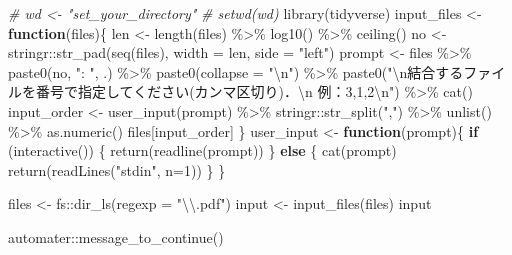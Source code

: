 \documentclass[
]{article}
\newenvironment{Shaded}{\begin{snugshade}}{\end{snugshade}}
\newcommand{\AttributeTok}[1]{\textcolor[rgb]{0.77,0.63,0.00}{#1}}
\newcommand{\CommentTok}[1]{\textcolor[rgb]{0.56,0.35,0.01}{\textit{#1}}}
\newcommand{\ControlFlowTok}[1]{\textcolor[rgb]{0.13,0.29,0.53}{\textbf{#1}}}
\newcommand{\DecValTok}[1]{\textcolor[rgb]{0.00,0.00,0.81}{#1}}
\newcommand{\FunctionTok}[1]{\textcolor[rgb]{0.00,0.00,0.00}{#1}}
\newcommand{\NormalTok}[1]{#1}
\newcommand{\OtherTok}[1]{\textcolor[rgb]{0.56,0.35,0.01}{#1}}
\newcommand{\SpecialCharTok}[1]{\textcolor[rgb]{0.00,0.00,0.00}{#1}}
\newcommand{\StringTok}[1]{\textcolor[rgb]{0.31,0.60,0.02}{#1}}
\begin{document}
\begin{Shaded}
\begin{Highlighting}[]
  \CommentTok{\# wd \textless{}{-} "set\_your\_directory"}
  \CommentTok{\# setwd(wd)}
\FunctionTok{library}\NormalTok{(tidyverse)}
\NormalTok{input\_files }\OtherTok{\textless{}{-}} \ControlFlowTok{function}\NormalTok{(files)\{}
\NormalTok{  len }\OtherTok{\textless{}{-}} \FunctionTok{length}\NormalTok{(files) }\SpecialCharTok{\%\textgreater{}\%} \FunctionTok{log10}\NormalTok{() }\SpecialCharTok{\%\textgreater{}\%} \FunctionTok{ceiling}\NormalTok{()}
\NormalTok{  no }\OtherTok{\textless{}{-}}\NormalTok{ stringr}\SpecialCharTok{::}\FunctionTok{str\_pad}\NormalTok{(}\FunctionTok{seq}\NormalTok{(files), }\AttributeTok{width =}\NormalTok{ len, }\AttributeTok{side =} \StringTok{"left"}\NormalTok{)}
\NormalTok{  prompt }\OtherTok{\textless{}{-}} 
\NormalTok{    files }\SpecialCharTok{\%\textgreater{}\%}
    \FunctionTok{paste0}\NormalTok{(no, }\StringTok{": "}\NormalTok{, .) }\SpecialCharTok{\%\textgreater{}\%}
    \FunctionTok{paste0}\NormalTok{(}\AttributeTok{collapse =} \StringTok{"}\SpecialCharTok{\textbackslash{}n}\StringTok{"}\NormalTok{) }\SpecialCharTok{\%\textgreater{}\%}
    \FunctionTok{paste0}\NormalTok{(}\StringTok{"}\SpecialCharTok{\textbackslash{}n}\StringTok{結合するファイルを番号で指定してください(カンマ区切り)．}\SpecialCharTok{\textbackslash{}n}\StringTok{  例：3,1,2}\SpecialCharTok{\textbackslash{}n}\StringTok{"}\NormalTok{) }\SpecialCharTok{\%\textgreater{}\%}
    \FunctionTok{cat}\NormalTok{()}
\NormalTok{  input\_order }\OtherTok{\textless{}{-}} 
    \FunctionTok{user\_input}\NormalTok{(prompt) }\SpecialCharTok{\%\textgreater{}\%}
\NormalTok{    stringr}\SpecialCharTok{::}\FunctionTok{str\_split}\NormalTok{(}\StringTok{","}\NormalTok{) }\SpecialCharTok{\%\textgreater{}\%}
    \FunctionTok{unlist}\NormalTok{() }\SpecialCharTok{\%\textgreater{}\%}
    \FunctionTok{as.numeric}\NormalTok{()}
\NormalTok{  files[input\_order]}
\NormalTok{\}}
\NormalTok{user\_input }\OtherTok{\textless{}{-}} \ControlFlowTok{function}\NormalTok{(prompt)\{}
  \ControlFlowTok{if}\NormalTok{ (}\FunctionTok{interactive}\NormalTok{()) \{}
    \FunctionTok{return}\NormalTok{(}\FunctionTok{readline}\NormalTok{(prompt))}
\NormalTok{  \} }\ControlFlowTok{else}\NormalTok{ \{}
    \FunctionTok{cat}\NormalTok{(prompt)}
    \FunctionTok{return}\NormalTok{(}\FunctionTok{readLines}\NormalTok{(}\StringTok{"stdin"}\NormalTok{, }\AttributeTok{n=}\DecValTok{1}\NormalTok{))}
\NormalTok{  \}}
\NormalTok{\}}

\NormalTok{files }\OtherTok{\textless{}{-}}\NormalTok{ fs}\SpecialCharTok{::}\FunctionTok{dir\_ls}\NormalTok{(}\AttributeTok{regexp =} \StringTok{"}\SpecialCharTok{\textbackslash{}\textbackslash{}}\StringTok{.pdf"}\NormalTok{)}
\NormalTok{input }\OtherTok{\textless{}{-}} \FunctionTok{input\_files}\NormalTok{(files)}
\NormalTok{input}

\NormalTok{automater}\SpecialCharTok{::}\FunctionTok{message\_to\_continue}\NormalTok{()}
\end{Highlighting}
\end{Shaded}
\end{document}

